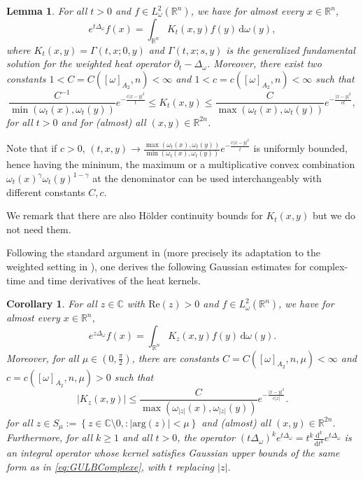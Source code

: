 \documentclass[12pt, letterpaper]{amsart}
\newtheorem{cor}[thm]{Corollary}
\newtheorem{lem}[thm]{Lemma}
\theoremstyle{definition}
\theoremstyle{remark}
\numberwithin{equation}{section}
\begin{document}
\begin{lem}\label{lem:GULB}
For all $t>0$ and $f \in L^2_\omega(\mathbb{R}^n)$, we have for almost every $x\in \mathbb{R}^n$,
    \begin{equation*}
        e^{t\Delta_\omega}f(x)= \int_{\mathbb{R}^n} K_t(x,y)f(y) \, \mathrm{d}\omega(y),
    \end{equation*}
    where $K_t(x,y)=\Gamma(t,x;0,y)$ and $\Gamma(t,x;s,y)$ is the generalized fundamental solution for the weighted heat operator $\partial_t-\Delta_\omega$. Moreover, there exist two constants $1<C=C([ \omega  ]_{A_2},n)<\infty$ and $1<c=c([ \omega  ]_{A_2},n)<\infty$ such that 
\begin{equation}\label{eq:GULB}
     \frac{C^{-1}}{\min(\omega_{t}(x),\omega_t(y))} e^{- \frac{c\left | x-y \right |^2}{t}} \leq 
     K_t(x,y) \leq \frac{C}{\max(\omega_{t}(x),\omega_t(y))} e^{- \frac{\left | x-y \right |^2}{ct}},
\end{equation}
for all $t>0$ and for (almost) all $(x,y) \in \mathbb{R}^{2n}$. 
\end{lem}

Note that if $c>0$,  $(t,x,y)\to \frac{\max(\omega_{t}(x),\omega_t(y))}  {\min(\omega_{t}(x),\omega_t(y))} e^{- \frac{c\left | x-y \right |^2}{t}}$ is uniformly bounded,  hence having the mininum, the maximum or a multiplicative convex combination   $\omega_{t}(x)^\gamma\omega_t(y)^{1-\gamma}$ at the denominator can be used interchangeably with different constants $C,c$. 
     
We remark that there are also  H\"older continuity bounds for $K_t(x,y)$ but we do not need them. 

Following the standard argument in \cite[Lemma~19,~p.~48]{auscher1998square} (more precisely its adaptation to the weighted setting in \cite[Theorem 4]{cruz2014corrigendum}), one derives the following Gaussian estimates for complex-time and time derivatives of the heat kernels.

\begin{cor}\label{cor:semigroupe}
    For all $z \in \mathbb{C}$ with $\mathrm{Re}(z)>0$ and $f \in L^2_\omega(\mathbb{R}^n)$, we have for almost every $x\in \mathbb{R}^n$,
    \begin{equation*}
        e^{z\Delta_\omega}f(x)= \int_{\mathbb{R}^n} K_z(x,y)f(y) \, \mathrm{d}\omega(y).
    \end{equation*}
    Moreover, for all $\mu \in (0,\frac{\pi}{2})$,  there are constants $C=C([ \omega  ]_{A_2},n,\mu)<\infty$ and $c=c([ \omega  ]_{A_2},n,\mu)>0$ such that
    \begin{equation}\label{eq:GULBComplexe}
     | K_z(x,y) | \leq \frac{C}{\max(\omega_{|z|}(x),\omega_{|z|}(y))} e^{- \frac{\left | x-y \right |^2}{c|z|}}.
\end{equation}
for all $z \in S_\mu:= \left\{ z \in \mathbb{C} \setminus {0} , : |\mathrm{arg}(z)| < \mu \right\}$ and (almost) all $(x,y) \in \mathbb{R}^{2n}$. {Furthermore, for all $k \ge 1$ and all $t > 0$, the operator $(t\Delta_\omega)^k e^{t\Delta_\omega} = t^k \frac{\mathrm{d}^k}{\mathrm{d}t^k} e^{t\Delta_\omega}$ is an integral operator whose kernel satisfies Gaussian upper bounds of the same form as in \eqref{eq:GULBComplexe}, with $t$ replacing $|z|$.}
\end{cor}
\end{document}
